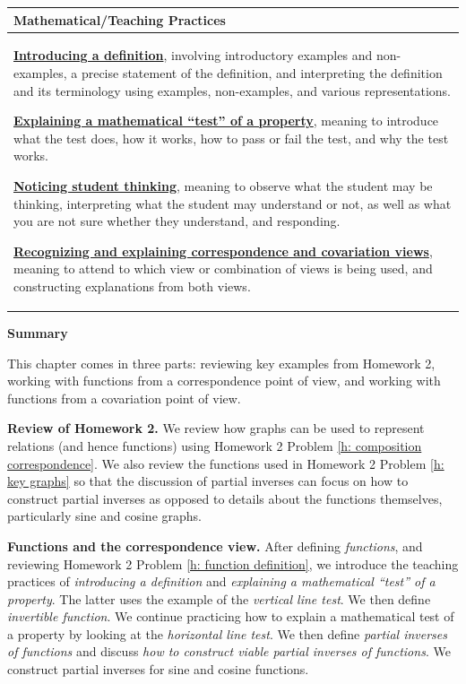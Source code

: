 \documentclass[11pt]{article}
\newcommand\header[1]{\vspace*{4pt}\par {\large {\bf #1}}\par}
\renewcommand\emph[1]{\underline{\bf{#1}}} %
\theoremstyle{definition}
\begin{document}
\vspace*{-12pt}
\begin{tabular}{L{6.5in}} 
{\bf Mathematical/Teaching Practices} \\ \hline \parskip4pt
\emph{Introducing a definition}, involving introductory examples and non-examples, a precise statement of the definition, and interpreting the definition and its terminology using examples, non-examples, and various representations. 

\emph{Explaining a mathematical ``test'' of a property}, meaning to introduce what the test does, how it works, how to pass or fail the test, and why the test works.

\emph{Noticing student thinking}, meaning to observe what the student may be thinking, interpreting what the student may understand or not, as well as what you are not sure whether they understand, and responding.

\emph{Recognizing and explaining correspondence and covariation views}, meaning to attend to which view or combination of views is being used, and constructing explanations from both views. 
\end{tabular}

\header{Summary}

This chapter comes in three parts: reviewing key examples from Homework 2, working with functions from a correspondence point of view, and working with functions from a covariation point of view.

{\bf Review of Homework 2.} We review how graphs can be used to represent relations (and hence functions) using Homework 2 Problem \ref{h: composition correspondence}. We also review the functions used in Homework 2 Problem \ref{h: key graphs} so that the discussion of partial inverses can focus on how to construct partial inverses as opposed to details about the functions themselves, particularly sine and cosine graphs.

{\bf Functions and the correspondence view.} After defining {\it functions}, and reviewing Homework 2 Problem \ref{h: function definition}, we introduce the teaching practices of {\it introducing a definition} and {\it explaining a mathematical ``test'' of a property}. The latter uses the example of the {\it vertical line test}.   We then define {\it invertible function}. We continue practicing how to explain a mathematical test of a property by looking at the {\it horizontal line test}. We then define {\it partial inverses of functions} and discuss {\it how to construct viable partial inverses of functions}. We construct partial inverses for sine and cosine functions.
\end{document}
